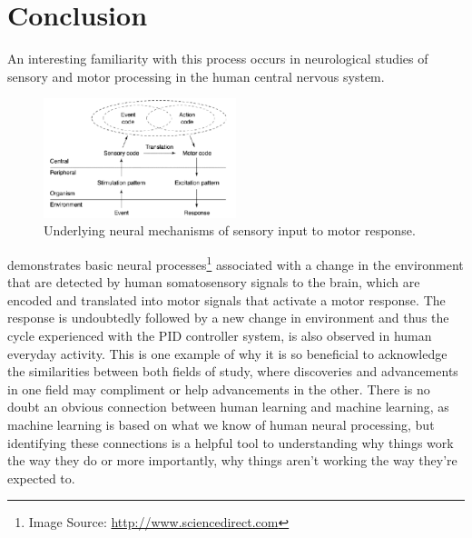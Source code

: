 \section{Conclusion}\label{section_conclusion}
An interesting familiarity with this process occurs in neurological studies of sensory and motor processing in the human central nervous system.

\begin{figure}[!ht]
\centering
\includegraphics[width=0.5\textwidth]{images/neural-fig.pdf}
\caption{\label{neural-figure} Underlying neural mechanisms of sensory input to motor response.}
\end{figure}

 demonstrates basic neural processes\footnote{Image Source: \url{http://www.sciencedirect.com}}
 associated with a change in the environment that are detected by human somatosensory signals to the brain, which are encoded and translated into motor signals that activate a motor response. The response is undoubtedly followed by a new change in environment and thus the cycle experienced with the PID controller system, is also observed in human everyday activity. This is one example of why it is so beneficial to acknowledge the similarities between both fields of study, where discoveries and advancements in one field may compliment or help advancements in the other. There is no doubt an obvious connection between human learning and machine learning, as machine learning is based on what we know of human neural processing, but identifying these connections is a helpful tool to understanding why things work the way they do or more importantly, why things aren't working the way they're expected to.
